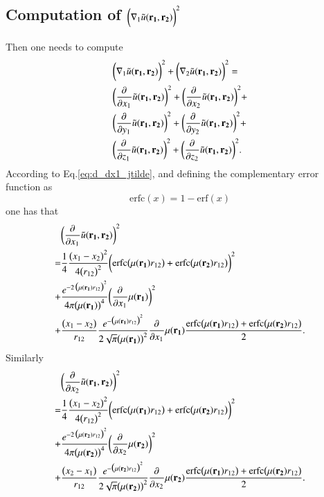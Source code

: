 \documentclass[aip,jcp,reprint,noshowkeys,superscriptaddress]{revtex4-1}
\newcommand{\deriv}[3]{\frac{\partial^{#3} #1}{\partial {#2}^{#3}}}
\newcommand{\bd}[1]{{\bf {#1}}}
\newcommand{\mur}[1]{\mu({\bf r_{#1}})}
\begin{document}
\subsection{Computation of $\bigg(\nabla_1\tilde{u}(\bd{r_1},\bd{r_2})\bigg)^2$}
Then one needs to compute 
\begin{equation}
 \begin{aligned}
& \bigg(\nabla_1\tilde{u}(\bd{r_1},\bd{r_2})\bigg)^2 + \bigg(\nabla_2\tilde{u}(\bd{r_1},\bd{r_2})\bigg)^2 = \\
& \bigg(\deriv{}{x_1}{}\tilde{u}(\bd{r_1},\bd{r_2}) \bigg)^2 + \bigg(\deriv{}{x_2}{}\tilde{u}(\bd{r_1},\bd{r_2}) \bigg)^2 +  \\
& \bigg(\deriv{}{y_1}{}\tilde{u}(\bd{r_1},\bd{r_2}) \bigg)^2 + \bigg(\deriv{}{y_2}{}\tilde{u}(\bd{r_1},\bd{r_2}) \bigg)^2 +  \\
& \bigg(\deriv{}{z_1}{}\tilde{u}(\bd{r_1},\bd{r_2}) \bigg)^2 + \bigg(\deriv{}{z_2}{}\tilde{u}(\bd{r_1},\bd{r_2}) \bigg)^2.
 \end{aligned}
\end{equation}
According to Eq.\eqref{eq:d_dx1_jtilde}, 
and defining the complementary error function as 
\begin{equation}
 \text{erfc}(x) = 1 - \text{erf}(x)
\end{equation}
one has that 
\begin{equation}
 \begin{aligned}
& \bigg(\deriv{}{x_1}{}\tilde{u}(\bd{r_1},\bd{r_2}) \bigg)^2  \\
 = & \frac{1}{4}\frac{\big( x_1 - x_2 \big)^2}{4 \big(r_{12}\big)^2} \bigg(\text{erfc}\big(\mur{1} r_{12}\big) + \text{erfc}\big(\mur{2} r_{12}\big) \bigg)^2  \\
 + & \frac{e^{-2 \,\big(\mur{1}r_{12} \big)^2}}{4\pi \big(\mur{1}\big)^4} \bigg( \deriv{}{x_1}{}\mur{1} \bigg)^2 \\
 + & \frac{\big(x_1 - x_2\big)}{r_{12}} \frac{e^{-\big(\mur{1} r_{12}\big)^2}}{2\sqrt{\pi} \big(\mur{1}\big)^2} \deriv{}{x_1}{}\mur{1} 
 \frac{\text{erfc}\big(\mur{1} r_{12}\big) + \text{erfc}\big(\mur{2} r_{12}\big)}{2}.
 \end{aligned}
\end{equation}
Similarly 
\begin{equation}
 \begin{aligned}
& \bigg(\deriv{}{x_2}{}\tilde{u}(\bd{r_1},\bd{r_2}) \bigg)^2  \\
 = & \frac{1}{4}\frac{\big( x_1 - x_2 \big)^2}{4 \big(r_{12}\big)^2} \bigg(\text{erfc}\big(\mur{1} r_{12}\big) + \text{erfc}\big(\mur{2} r_{12}\big) \bigg)^2  \\
 + & \frac{e^{-2 \,\big(\mur{2}r_{12} \big)^2}}{4\pi \big(\mur{2}\big)^4} \bigg( \deriv{}{x_2}{}\mur{2} \bigg)^2 \\
 + & \frac{\big(x_2 - x_1\big)}{r_{12}} \frac{e^{-\big(\mur{2} r_{12}\big)^2}}{2\sqrt{\pi} \big(\mur{2}\big)^2} \deriv{}{x_2}{}\mur{2} 
 \frac{\text{erfc}\big(\mur{1} r_{12}\big) + \text{erfc}\big(\mur{2} r_{12}\big)}{2}.
 \end{aligned}
\end{equation}
\end{document}
